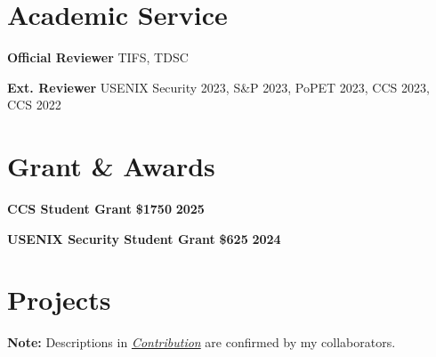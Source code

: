 \documentclass{resume}
\begin{document}
\section{Academic Service}
\begin{content}
  {\bf Official Reviewer} \enspace TIFS, TDSC

		{\bf Ext. Reviewer} \enspace USENIX Security 2023, S\&P 2023, PoPET 2023, CCS 2023, CCS 2022
\end{content}

\section{Grant \& Awards}
\begin{content}
  \textbf{CCS Student Grant} \textbf{\$1750} \hfill \textbf{2025} 

  \textbf{USENIX Security Student Grant} \textbf{\$625} \hfill \textbf{2024}
\end{content}

\section{Projects}

\textbf{Note:} Descriptions in \underline{\textit{Contribution}} are confirmed by my collaborators.
\end{document}
